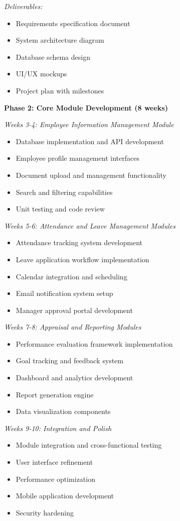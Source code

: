 \documentclass[12pt]{article}
\begin{document}
\textit{Deliverables:}
\begin{itemize}[noitemsep]
\item Requirements specification document
\item System architecture diagram
\item Database schema design
\item UI/UX mockups
\item Project plan with milestones
\end{itemize}

\textbf{Phase 2: Core Module Development (8 weeks)}

\textit{Weeks 3-4: Employee Information Management Module}
\begin{itemize}[noitemsep]
\item Database implementation and API development
\item Employee profile management interfaces
\item Document upload and management functionality
\item Search and filtering capabilities
\item Unit testing and code review
\end{itemize}

\textit{Weeks 5-6: Attendance and Leave Management Modules}
\begin{itemize}[noitemsep]
\item Attendance tracking system development
\item Leave application workflow implementation
\item Calendar integration and scheduling
\item Email notification system setup
\item Manager approval portal development
\end{itemize}

\textit{Weeks 7-8: Appraisal and Reporting Modules}
\begin{itemize}[noitemsep]
\item Performance evaluation framework implementation
\item Goal tracking and feedback system
\item Dashboard and analytics development
\item Report generation engine
\item Data visualization components
\end{itemize}

\textit{Weeks 9-10: Integration and Polish}
\begin{itemize}[noitemsep]
\item Module integration and cross-functional testing
\item User interface refinement
\item Performance optimization
\item Mobile application development
\item Security hardening
\end{itemize}
\end{document}

